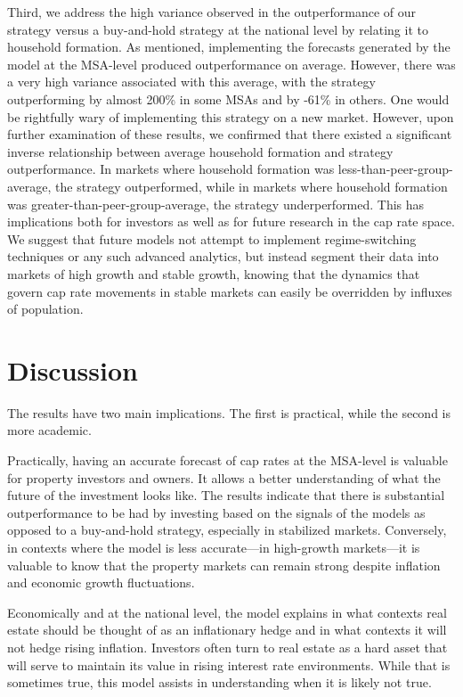 \documentclass[jrfm,article,accept,oneauthor,pdftex]{Definitions/mdpi}
\begin{document}
Third, we address the high variance observed in the outperformance of our strategy versus a buy-and-hold strategy at the national level by relating it to household formation. As mentioned, implementing the forecasts generated by the model at the MSA-level produced outperformance on average. However, there was a very high variance associated with this average, with the strategy outperforming by almost 200\% in some MSAs and by -61\% in others. One would be rightfully wary of implementing this strategy on a new market. However, upon further examination of these results, we confirmed that there existed a significant inverse relationship between average household formation and strategy outperformance. In markets where household formation was less-than-peer-group-average, the strategy outperformed, while in markets where household formation was  greater-than-peer-group-average, the strategy underperformed. This has implications both for investors as well as for future research in the cap rate space. We suggest that future models not attempt to implement regime-switching techniques or any such advanced analytics, but instead segment their data into markets of high growth and stable growth, knowing that the dynamics that govern cap rate movements in stable markets can easily be overridden by influxes of population. 


\section{Discussion}

The results have two main implications. The first is practical, while the second is more academic. 

Practically, having an accurate forecast of cap rates at the MSA-level is valuable for property investors and owners. It allows a better understanding of what the future of the investment looks like. The results indicate that there is substantial outperformance to be had by investing based on the signals of the models as opposed to a buy-and-hold strategy, especially in stabilized markets. Conversely, in contexts where the model is less accurate---in high-growth markets---it is valuable to know that the property markets can remain strong despite inflation and economic growth fluctuations.

Economically and at the national level, the model explains in what contexts real estate should be thought of as an inflationary hedge and in what contexts it will not hedge rising inflation. Investors often turn to real estate as a hard asset that will serve to maintain its value in rising interest rate environments. While that is sometimes true, this model assists in understanding when it is likely not true. 
\end{document}
